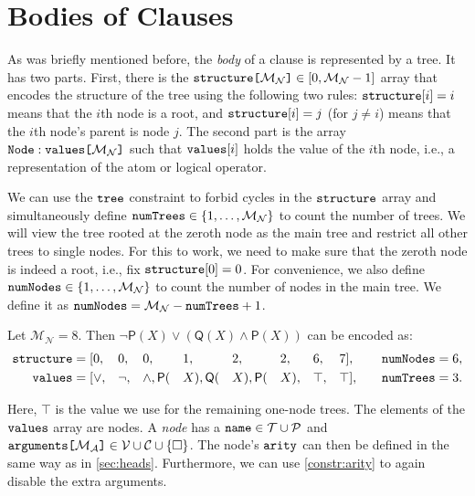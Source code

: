 \documentclass[runningheads]{llncs}
\newcommand{\variable}[1]{\texttt{\textup{#1}}}
\newcommand{\arrayd}[3]{\variable{{#1}[}{#2}\variable{]} \in {#3}}
\newcommand{\arrayt}[3]{\variable{{#3}} : \variable{{#1}[}{#2}\variable{]}}
\newcommand{\predicates}{\mathcal{P}}
\newcommand{\variables}{\mathcal{V}}
\newcommand{\constants}{\mathcal{C}}
\newcommand{\tokens}{\mathcal{T}}
\newcommand{\maxArity}{\mathcal{M}_{\mathcal{A}}}
\newcommand{\maxNumNodes}{\mathcal{M}_{\mathcal{N}}}
\begin{document}
\section{Bodies of Clauses} \label{sec:bodies}

As was briefly mentioned before, the \emph{body} of a clause is represented by a
tree. It has two parts. First, there is the
$\arrayd{structure}{\maxNumNodes{}}{[0, \maxNumNodes{} - 1]}$ array that encodes
the structure of the tree using the following two rules:
$\variable{structure}[i] = i$ means that the $i$th node is a root, and
$\variable{structure}[i] = j$ (for $j \ne i$) means that the $i$th node's
parent is node $j$. The second part is the array
$\arrayt{values}{\maxNumNodes{}}{Node}$ such that $\variable{values}[i]$ holds
the value of the $i$th node, i.e., a representation of the atom or logical
operator.

We can use the $\variable{tree}$ constraint \cite{DBLP:conf/cp/FagesL11} to
forbid cycles in the $\variable{structure}$ array and simultaneously define
$\variable{numTrees} \in \{ 1, \dots, \maxNumNodes{} \}$ to count the number of
trees. We will view the tree rooted at the zeroth node as the main tree and
restrict all other trees to single nodes. For this to work, we need to make sure
that the zeroth node is indeed a root, i.e., fix $\variable{structure}[0] = 0$.
For convenience, we also define $\variable{numNodes} \in \{ 1, \dots,
\maxNumNodes{} \}$ to count the number of nodes in the main tree. We define it
as $\variable{numNodes} = \maxNumNodes{} - \variable{numTrees} + 1$.

\begin{example} \label{example:formula}
  Let $\maxNumNodes{} = 8$. Then $\neg\mathsf{P}(X) \lor (\mathsf{Q}(X) \land
  \mathsf{P}(X))$ can be encoded as:
  \begin{alignat*}{9}
    \variable{structure} &= [0, &&0, &&0, &&1, &&2, &&2, &&6, &&7], \quad
    &&\variable{numNodes} = 6, \\
    \variable{values} &= [{\lor}, &&{\neg}, &&{\land}, \mathsf{P}(&&X),
    \mathsf{Q}(&&X), \mathsf{P}(&&X), &&\top, &&\top], \quad
    &&\variable{numTrees} = 3.
  \end{alignat*}
\end{example}

Here, $\top$ is the value we use for the remaining one-node trees. The
elements of the $\variable{values}$ array are nodes. A \emph{node} has a
$\variable{name} \in \tokens{} \cup \predicates{}$ and
$\arrayd{arguments}{\maxArity{}}{\variables{} \cup \constants{} \cup \{ \Box
  \}}$. The node's $\variable{arity}$ can then be defined in the same way as in
\cref{sec:heads}. Furthermore, we can use \cref{constr:arity} to again disable
the extra arguments.
\end{document}
